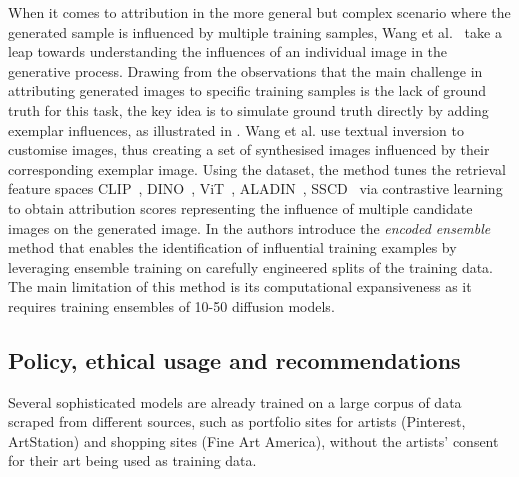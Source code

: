 \documentclass[conference,table]{IEEEtran} %
\begin{document}
When it comes to attribution in the more general but complex scenario where the generated sample is influenced by multiple training samples, Wang et al.~\cite{wang_evaluating_2023} take a leap towards understanding the influences of an individual image in the generative process. 
Drawing from the observations that the main challenge in attributing generated images to specific training samples is the lack of ground truth for this task, the key idea is to simulate ground truth directly by adding exemplar influences, as illustrated in .
Wang et al. use textual inversion to customise images, thus creating a set of synthesised images influenced by their corresponding exemplar image. 
Using the dataset, the method tunes the retrieval feature spaces CLIP~\cite{pizzi_self-supervised_2022}, DINO~\cite{caron_emerging_2021}, ViT~\cite{dosovitskiy_image_2021}, ALADIN~\cite{ruta_aladin_2021}, SSCD~\cite{pizzi_self-supervised_2022} via contrastive learning~\cite{oord_representation_2019} to obtain attribution scores representing the influence of multiple candidate images on the generated image.
In \cite{dai_training_2023} the authors introduce the \textit{encoded ensemble} method that enables the identification of influential training examples by leveraging ensemble training on carefully engineered splits of the training data. 
The main limitation of this method is its computational expansiveness as it requires training ensembles of 10-50 diffusion models.

\subsection{Policy, ethical usage and recommendations}\label{sec:mitigation-ethical} %

Several sophisticated models are already trained on a large corpus of data scraped from different sources, such as portfolio sites for artists (Pinterest, ArtStation) and shopping sites (Fine Art America), without the artists' consent for their art being used as training data.
\end{document}
